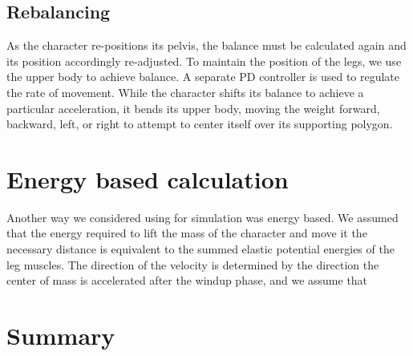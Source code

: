 \subsection{Rebalancing}
As the character re-positions its pelvis, the balance must be calculated again and its position accordingly re-adjusted.  To maintain the position of the legs, we use the upper body to achieve balance.  A separate PD controller is used to regulate the rate of movement.  While the character shifts its balance to achieve a particular acceleration, it bends its upper body, moving the weight forward, backward, left, or right to attempt to center itself over its supporting polygon.

\section{Energy based calculation}
Another way we considered using for simulation was energy based.  We assumed that the energy required to lift the mass of the character and move it the necessary distance is equivalent to the summed elastic potential energies of the leg muscles.  The direction of the velocity is determined by the direction the center of mass is accelerated after the windup phase, and we assume that 

\section{Summary}
\label{subsection:animation_summary}